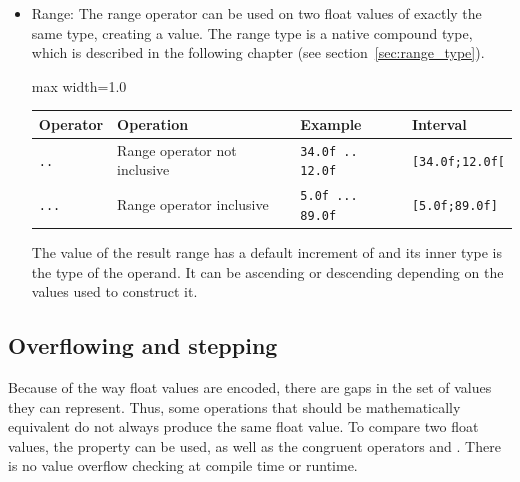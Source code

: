 \begin{itemize}
  \begin{lstlisting}[style=coloredverbatim]
let mut a = 11.0;
let b = a * 12.0 + 3.0;
a *= 12.0 + 3.0;

assert(b == 135.0);
assert(a == 165.0);
  \end{lstlisting}

\item Range: The range operator can be used on two float values of exactly the
  same type, creating a  value. The range type is a native
  compound type, which is described in the following chapter (see
  section~\ref{sec:range_type}).

  \begin{center}
    \begin{adjustbox}{max width=1.0\linewidth}
      \begin{tabular}{|l|lll|}
        \hline
        Operator & Operation & Example & Interval\\[0pt]
        \hline
        \hline
        \texttt{..} & Range operator not inclusive & \texttt{34.0f .. 12.0f} & \texttt{[34.0f;12.0f[}\\[0pt]
            \texttt{...} & Range operator inclusive & \texttt{5.0f ... 89.0f} & \texttt{[5.0f;89.0f]}\\[0pt]
            \hline
      \end{tabular}
    \end{adjustbox}
  \end{center}


  The value of the result range has a default increment of  and its
  inner type is the type of the operand. It can be ascending or descending
  depending on the values used to construct it.

\end{itemize}

\subsection{Overflowing and stepping}
\label{sec:orgd5d9f51}

Because of the way float values are encoded, there are gaps in the set of values
they can represent. Thus, some operations that should be mathematically
equivalent do not always produce the same float value. To compare two float
values, the property  can be used, as well as the congruent
operators \token{<=>} and \token{<!>}. There is no value overflow checking
at compile time or runtime.

\vfill%
\pagebreak
